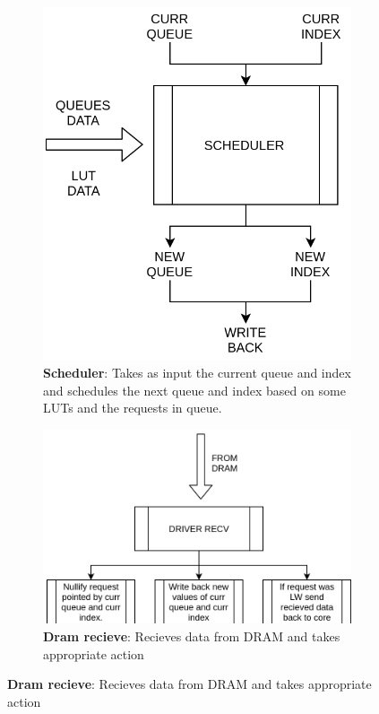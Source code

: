 \documentclass[hidelinks,12pt]{article}
\begin{document}
\begin{figure}[H]
    \ContinuedFloat
    \centering

    \begin{subfigure}[h]{\textwidth}
        \begin{center}
            \includegraphics[scale=0.4]{img/scheduler.png}
            \caption{\textbf{Scheduler}: Takes as input the current queue and index and schedules the next queue and index based on some LUTs and the requests in queue.}

        \end{center}

    \end{subfigure}
    \begin{subfigure}[h]{\textwidth}
        \begin{center}
            \includegraphics[scale=0.3, trim = 0 0 10 0]{img/dram_recv.png}
            \caption{\textbf{Dram recieve}: Recieves data from DRAM and takes appropriate action}


\end{center}
\end{subfigure}
\end{figure}
\end{document}
